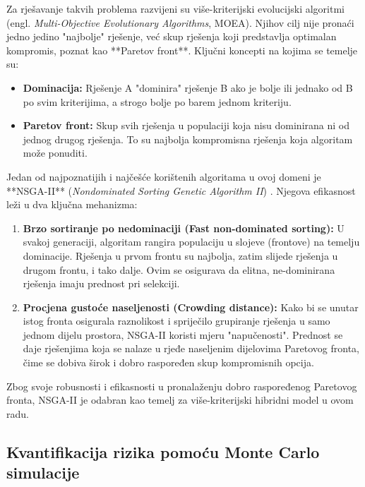 Za rješavanje takvih problema razvijeni su više-kriterijski evolucijski algoritmi (engl. \textit{Multi-Objective Evolutionary Algorithms}, MOEA). Njihov cilj nije pronaći jedno jedino "najbolje" rješenje, već skup rješenja koji predstavlja optimalan kompromis, poznat kao **Paretov front**. Ključni koncepti na kojima se temelje su:

\begin{itemize}
    \item \textbf{Dominacija:} Rješenje A "dominira" rješenje B ako je bolje ili jednako od B po svim kriterijima, a strogo bolje po barem jednom kriteriju.
    \item \textbf{Paretov front:} Skup svih rješenja u populaciji koja nisu dominirana ni od jednog drugog rješenja. To su najbolja kompromisna rješenja koja algoritam može ponuditi.
\end{itemize}

Jedan od najpoznatijih i najčešće korištenih algoritama u ovoj domeni je **NSGA-II** (\textit{Nondominated Sorting Genetic Algorithm II}) \cite{Deb2002}. Njegova efikasnost leži u dva ključna mehanizma:

\begin{enumerate}
    \item \textbf{Brzo sortiranje po nedominaciji (Fast non-dominated sorting):} U svakoj generaciji, algoritam rangira populaciju u slojeve (frontove) na temelju dominacije. Rješenja u prvom frontu su najbolja, zatim slijede rješenja u drugom frontu, i tako dalje. Ovim se osigurava da elitna, ne-dominirana rješenja imaju prednost pri selekciji.
    
    \item \textbf{Procjena gustoće naseljenosti (Crowding distance):} Kako bi se unutar istog fronta osigurala raznolikost i spriječilo grupiranje rješenja u samo jednom dijelu prostora, NSGA-II koristi mjeru "napučenosti". Prednost se daje rješenjima koja se nalaze u rjeđe naseljenim dijelovima Paretovog fronta, čime se dobiva širok i dobro raspoređen skup kompromisnih opcija.
\end{enumerate}

Zbog svoje robusnosti i efikasnosti u pronalaženju dobro raspoređenog Paretovog fronta, NSGA-II je odabran kao temelj za više-kriterijski hibridni model u ovom radu.
\subsection{Kvantifikacija rizika pomoću Monte Carlo simulacije}

